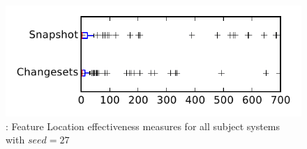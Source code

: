 
\begin{figure}
\centering
\includegraphics[height=0.4\textheight]{figures/flt_seed/rq1_tiny_27}
\caption{\rone: Feature Location effectiveness measures for all subject systems with $seed=27$}
\label{fig:flt_seed:rq1:tiny}
\end{figure}
